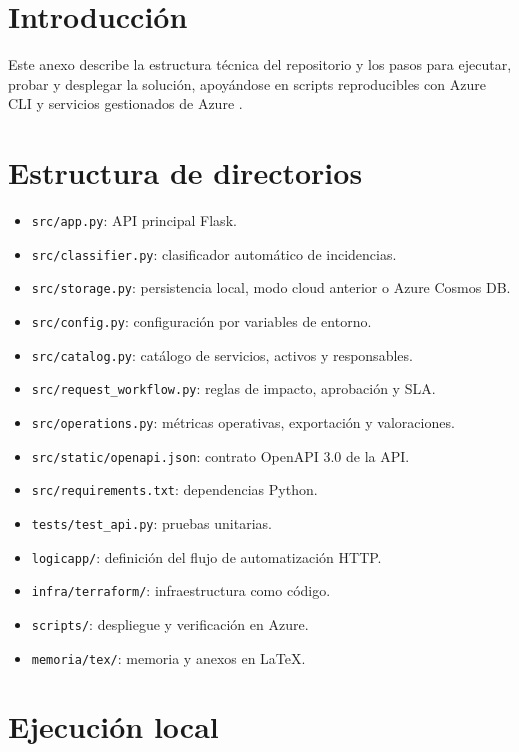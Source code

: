 
\section{Introducción}

Este anexo describe la estructura técnica del repositorio y los pasos para ejecutar, probar y desplegar la solución, apoyándose en scripts reproducibles con Azure CLI y servicios gestionados de Azure \cite{azure_keyvault,azure_appservice_keyvault_python}.

\section{Estructura de directorios}

\begin{itemize}
    \item \texttt{src/app.py}: API principal Flask.
    \item \texttt{src/classifier.py}: clasificador automático de incidencias.
    \item \texttt{src/storage.py}: persistencia local, modo cloud anterior o Azure Cosmos DB.
    \item \texttt{src/config.py}: configuración por variables de entorno.
    \item \texttt{src/catalog.py}: catálogo de servicios, activos y responsables.
    \item \texttt{src/request\_workflow.py}: reglas de impacto, aprobación y SLA.
    \item \texttt{src/operations.py}: métricas operativas, exportación y valoraciones.
    \item \texttt{src/static/openapi.json}: contrato OpenAPI 3.0 de la API.
    \item \texttt{src/requirements.txt}: dependencias Python.
    \item \texttt{tests/test\_api.py}: pruebas unitarias.
    \item \texttt{logicapp/}: definición del flujo de automatización HTTP.
    \item \texttt{infra/terraform/}: infraestructura como código.
    \item \texttt{scripts/}: despliegue y verificación en Azure.
    \item \texttt{memoria/tex/}: memoria y anexos en LaTeX.
\end{itemize}

\section{Ejecución local}

